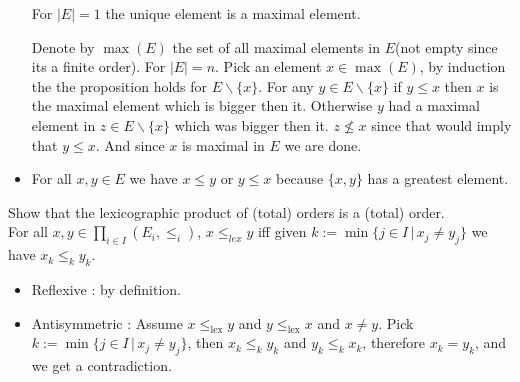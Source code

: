\documentclass[a4paper,11pt]{exam}
\begin{document}
\begin{questions}
\begin{solution}
\begin{itemize}
				For $|E|=1$ the unique element is a maximal element.
				
				Denote by $\max(E)$ the set of all maximal elements in $E$(not empty since its a finite order). For $|E|=n$. Pick an element $x\in \max(E)$, by induction the the proposition holds for $E\backslash\{x\}$. For any $y\in E\backslash\{x\}$ if $y\leq x$ then $x$ is the maximal element which is bigger then it. Otherwise $y$ had a maximal element in $z\in E\backslash\{x\}$  which was bigger then it. $z\not\leq x$ since that would imply that $y\leq x$. And since $x$ is maximal in $E$ we are done.
				
				
				\item For all $x,y \in E$ we have $x \leq y$ or $y \leq x$ because $\{x,y\}$ has a greatest element.
			\end{itemize}
		\end{solution}
		
		\question
		Show that the lexicographic product of (total) orders is a (total) order.\\ 
		For all $x,y\in\prod_{i\in I}(E_i,\leq_i)$, $x\leq_{lex}y$ iff given $k := \min \{j \in I\,|\,
		x_j \neq y_j\}$ we have $x_k\leq_ky_k$.
		
		\begin{solution}
			\begin{itemize}
				\item Reflexive : by definition.
				
				\item Antisymmetric : Assume $x \leq_{\mathrm{lex}} y$ and $y
				\leq_{\mathrm{lex}} x$ and $x \neq y$. Pick $k := \min \{j \in I\,|\,
				x_j \neq y_j\}$, then  $x_k \leq_k y_k$ and $y_k \leq_k x_k$, therefore
				$x_k = y_k$, and we get a contradiction.
				

\end{itemize}
\end{solution}
\end{questions}
\end{document}
